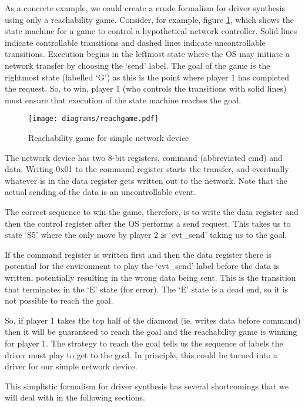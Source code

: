 \documentclass{article}
\begin{document}
As a concrete example, we could create a crude formalism for driver synthesis using only a reachability game. Consider, for example, figure \ref{fig:reach}, which shows the state machine for a game to control a hypothetical network controller. Solid lines indicate controllable transitions and dashed lines indicate uncontrollable transitions. Execution begins in the leftmost state where the OS may initiate a network transfer by choosing the `send' label. The goal of the game is the rightmost state (labelled `G') as this is the point where player 1 has completed the request. So, to win, player 1 (who controls the transitions with solid lines) must ensure that execution of the state machine reaches the goal. 

\begin{figure}[t]
\centering
\texttt{[image: diagrams/reachgame.pdf]}
\caption{Reachability game for simple network device}
\label{fig:reach}
\end{figure}

The network device has two 8-bit registers, command (abbreviated cmd) and data. Writing 0x01 to the command register starts the transfer, and eventually whatever is in the data register gets written out to the network. Note that the actual sending of the data is an uncontrollable event. 

The correct sequence to win the game, therefore, is to write the data register and then the control register after the OS performs a send request. This takes us to state `S5' where the only move by player 2 is `evt\_send' taking us to the goal. 

If the command register is written first and then the data register there is potential for the environment to play the `evt\_send' label before the data is written, potentially resulting in the wrong data being sent. This is the transition that terminates in the `E' state (for error). The `E' state is a dead end, so it is not possible to reach the goal. 

So, if player 1 takes the top half of the diamond (ie. writes data before command) then it will be guaranteed to reach the goal and the reachability game is winning for player 1. The strategy to reach the goal tells us the sequence of labels the driver must play to get to the goal. In principle, this could be turned into a driver for our simple network device.

This simplistic formalism for driver synthesis has several shortcomings that we will deal with in the following sections.
\end{document}
